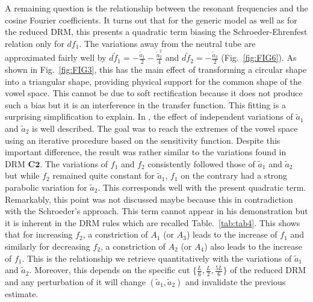 \documentclass[10pt,twocolumn]{article}
\let\cite\citep                             %
\begin{document}
A remaining question is the relationship between the resonant frequencies and the cosine Fourier coefficients. It turns out that for the generic model as well as for the reduced DRM, this presents a quadratic term biasing the Schroeder-Ehrenfest relation only for $df_1$. The variations away from the neutral tube are approximated fairly well by $d\tilde{f}_1=-\tfrac{\tilde{a}_1}{2}-\tfrac{\tilde{a}_2^2}{4}$ and $d\tilde{f}_2=-\tfrac{\tilde{a}_2}{2}$ (Fig.~\ref{fig:FIG6}). As shown in Fig.~\ref{fig:FIG3}, this has the main effect of transforming a circular shape into a triangular shape, providing physical support for the common shape of the vowel space. This cannot be due to soft rectification because it does not produce such a bias but it is an interference in the transfer function. This fitting is a surprising simplification to explain. In \cite[Fig.~3 and Fig.~4]{Carre2004}, the effect of independent variations of $\tilde{a}_1$ and $\tilde{a}_2$ is well described. The goal was to reach the extremes of the vowel space using an iterative procedure based on the sensitivity function. Despite this important difference, the result was rather similar to the variations found in DRM $\bm{C2}$. The variations of $f_1$ and $f_2$ consistently followed those of $\tilde{a}_1$ and $\tilde{a}_2$ but while $f_2$ remained quite constant for $\tilde{a}_1$, $f_1$ on the contrary had a strong parabolic variation for $\tilde{a}_2$. This corresponds well with the present quadratic term. Remarkably, this point was not discussed maybe because this in contradiction with the Schroeder's approach. This term cannot appear in his demonstration but it is inherent in the DRM rules \cite{Mrayati1988} which are recalled Table.~\ref{tab:tab4}. This shows that for increasing $f_2$, a constriction of $A_1$ (or $A_3$) leads to the increase of $f_1$ and similarly for decreasing $f_2$, a constriction of $A_2$ (or $A_4$) also leads to the increase of $f_1$. This is the relationship we retrieve quantitatively with the variations of $\tilde{a}_1$ and $\tilde{a}_2$. Moreover, this depends on the specific cut $\{\tfrac{L}{6},\tfrac{L}{2},\tfrac{5 L}{6}\}$ of the reduced DRM and any perturbation of it will change $(\tilde{a}_1,\tilde{a}_2)$ and invalidate the previous estimate.
\end{document}
